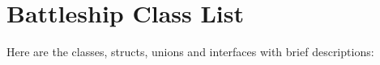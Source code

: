 \section{Battleship Class List}
Here are the classes, structs, unions and interfaces with brief descriptions:\begin{CompactList}
\item{}
\end{CompactList}
